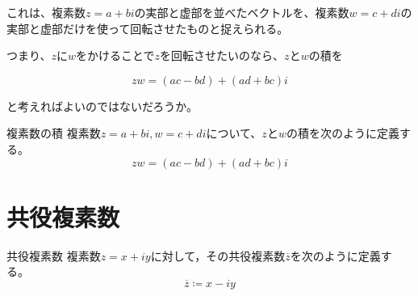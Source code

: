 \documentclass[../math-imaging]{subfiles}
\begin{document}
これは、複素数$z=a+bi$の実部と虚部を並べたベクトルを、複素数$w=c+di$の実部と虚部だけを使って回転させたものと捉えられる。

つまり、$z$に$w$をかけることで$z$を回転させたいのなら、$z$と$w$の積を

\begin{equation}
  zw = (ac - bd) + (ad + bc)i
\end{equation}

と考えればよいのではないだろうか。

\begin{definition}{複素数の積}
  \newline
  複素数$z=a+bi, w = c +di$について、$z$と$w$の積を次のように定義する。
  \LARGE
  \begin{equation}
    zw = (ac - bd) + (ad + bc)i
  \end{equation}
\end{definition}

\section{共役複素数}

\begin{definition}{共役複素数}
  \newline
  複素数$z=x+iy$に対して，その共役複素数$\overline{z}$を次のように定義する。
  \LARGE
  \begin{equation}
    \overline{z}\coloneqq x-iy
  \end{equation}
\end{definition}
\end{document}

